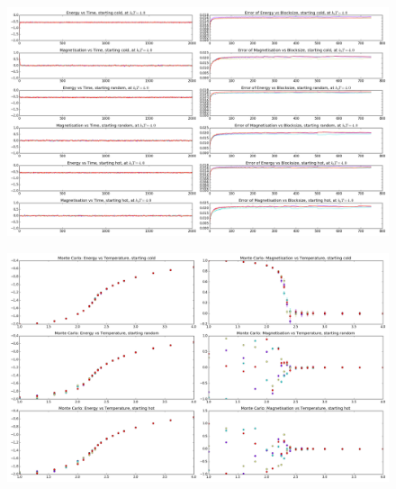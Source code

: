 \begin{frame}
	\begin{figure}
		\centering
		\includegraphics[width=1.0\textwidth]{Images/MC4}
	\end{figure}
\end{frame}
\begin{frame}
	\begin{figure}
		\centering
		\includegraphics[width=1.0\textwidth]{Images/MCT}
	\end{figure}
\end{frame}

